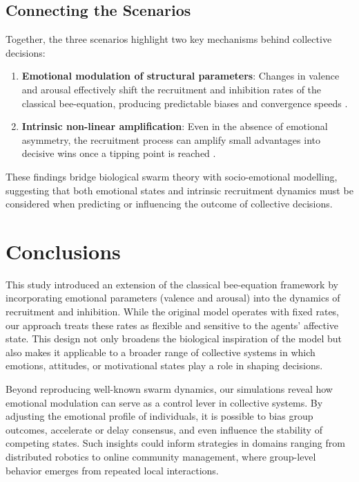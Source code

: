 \documentclass[a4paper,twoside]{article}
\begin{document}
\subsection{Connecting the Scenarios}
Together, the three scenarios highlight two key mechanisms behind collective decisions:
\begin{enumerate}
    \item \textbf{Emotional modulation of structural parameters}: Changes in valence and arousal effectively shift the recruitment and inhibition rates of the classical bee-equation, producing predictable biases and convergence speeds \cite{pais2013mechanism}.
    \item \textbf{Intrinsic non-linear amplification}: Even in the absence of emotional asymmetry, the recruitment process can amplify small advantages into decisive wins once a tipping point is reached \cite{Chase25}.
\end{enumerate}
These findings bridge biological swarm theory with socio-emotional modelling, suggesting that both emotional states and intrinsic recruitment dynamics must be considered when predicting or influencing the outcome of collective decisions.



\section{Conclusions}
\label{sec:conclusions}

This study introduced an extension of the classical bee-equation framework by incorporating emotional parameters (valence and arousal) into the dynamics of recruitment and inhibition. 
While the original model operates with fixed rates, our approach treats these rates as flexible and sensitive to the agents' affective state. 
This design not only broadens the biological inspiration of the model but also makes it applicable to a broader range of collective systems in which emotions, attitudes, or motivational states play a role in shaping decisions.

Beyond reproducing well-known swarm dynamics, our simulations reveal how emotional modulation can serve as a control lever in collective systems. 
By adjusting the emotional profile of individuals, it is possible to bias group outcomes, accelerate or delay consensus, and even influence the stability of competing states.  Such insights could inform strategies in domains ranging from distributed robotics to online community management, where group-level behavior emerges from repeated local interactions.
\end{document}
